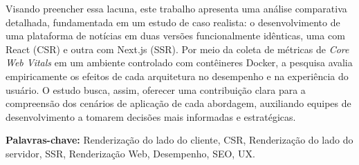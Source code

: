 \begin{resumo}
Visando preencher essa lacuna, este trabalho apresenta uma análise comparativa detalhada, fundamentada em um estudo de caso realista: o desenvolvimento de uma plataforma de notícias em duas versões funcionalmente idênticas, uma com React (CSR) e outra com Next.js (SSR). Por meio da coleta de métricas de \textit{Core Web Vitals} em um ambiente controlado com contêineres Docker, a pesquisa avalia empiricamente os efeitos de cada arquitetura no desempenho e na experiência do usuário. O estudo busca, assim, oferecer uma contribuição clara para a compreensão dos cenários de aplicação de cada abordagem, auxiliando equipes de desenvolvimento a tomarem decisões mais informadas e estratégicas.

\textbf{Palavras-chave:} Renderização do lado do cliente, CSR, Renderização do lado do servidor, SSR, Renderização Web, Desempenho, SEO, UX.
\end{resumo}
